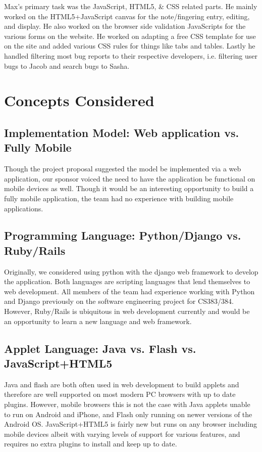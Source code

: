 \documentclass[12pt,english]{article}
\begin{document}
Max's primary task was the JavaScript, HTML5, \& CSS related parts.
He mainly worked on the HTML5+JavaScript canvas for the note/fingering
entry, editing, and display. He also worked on the browser side validation
JavaScripts for the various forms on the website. He worked on adapting
a free CSS template for use on the site and added various CSS rules
for things like tabs and tables. Lastly he handled filtering most
bug reports to their respective developers, i.e. filtering user bugs
to Jacob and search bugs to Sasha.


\section{Concepts Considered}


\subsection{Implementation Model: Web application vs. Fully Mobile}

Though the project proposal suggested the model be implemented via
a web application, our sponsor voiced the need to have the application
be functional on mobile devices as well. Though it would be an interesting
opportunity to build a fully mobile application, the team had no experience
with building mobile applications.


\subsection{Programming Language: Python/Django vs. Ruby/Rails}

Originally, we considered using python with the django web framework
to develop the application. Both languages are scripting languages
that lend themselves to web development. All members of the team had
experience working with Python and Django previously on the software
engineering project for CS383/384. However, Ruby/Rails is ubiquitous
in web development currently and would be an opportunity to learn
a new language and web framework.


\subsection{Applet Language: Java vs. Flash vs. JavaScript+HTML5 }

Java and flash are both often used in web development to build applets
and therefore are well supported on most modern PC browsers with up
to date plugins. However, mobile browsers this is not the case with
Java applets unable to run on Android and iPhone, and Flash only running
on newer versions of the Android OS. JavaScript+HTML5 is fairly new
but runs on any browser including mobile devices albeit with varying
levels of support for various features, and requires no extra plugins
to install and keep up to date.
\end{document}
